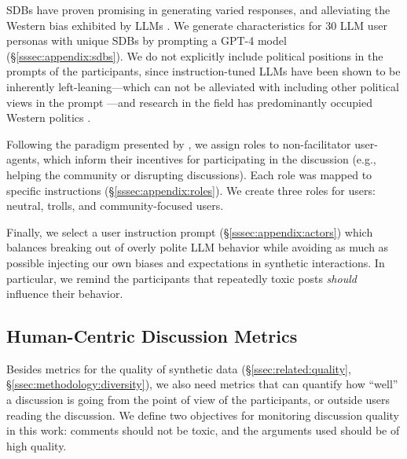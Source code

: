 \acfp{SDB} have proven promising in generating varied responses, and alleviating the Western bias exhibited by \acp{LLM} \cite{burton2024large}. We generate characteristics for 30 \ac{LLM} user personas with unique \acp{SDB} by prompting a GPT-4 model \cite{openai2024gpt4technicalreport} (\S\ref{sssec:appendix:sdbs}). We do not explicitly include political positions in the prompts of the participants, since instruction-tuned \acp{LLM} have been shown to be inherently left-leaning---which can not be alleviated with including other political views in the prompt \cite{Taubenfeld2024SystematicBI}---and research in the field has predominantly occupied Western politics \cite{Taubenfeld2024SystematicBI, potter-etal-2024-hidden, political_2024, pit2024oninvestigatingpoliticalstance}. %

Following the paradigm presented by \citet{abdelnabi_negotiations}, we assign roles to non-facilitator user-agents, which inform their incentives for participating in the discussion (e.g., helping the community or disrupting discussions). Each role was mapped to specific instructions (\S\ref{sssec:appendix:roles}). We create three roles for users: neutral, trolls, and community-focused users. 

Finally, we select a user instruction prompt (\S\ref{sssec:appendix:actors}) which balances breaking out of overly polite \ac{LLM} behavior while avoiding as much as possible injecting our own biases and expectations in synthetic interactions. In particular, we remind the participants that repeatedly toxic posts \emph{should} influence their behavior. 


\subsection{Human-Centric Discussion Metrics}
\label{ssec:experimental:metrics}

Besides metrics for the quality of synthetic data (\S\ref{ssec:related:quality}, \S\ref{ssec:methodology:diversity}), we also need metrics that can quantify how ``well'' a discussion is going from the point of view of the participants, or outside users reading the discussion. We define two objectives for monitoring discussion quality in this work: comments should not be toxic, and the arguments used should be of high quality. 

